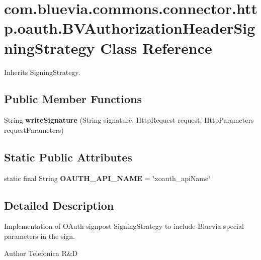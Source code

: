 \hypertarget{classcom_1_1bluevia_1_1commons_1_1connector_1_1http_1_1oauth_1_1BVAuthorizationHeaderSigningStrategy}{
\section{com.bluevia.commons.connector.http.oauth.BVAuthorizationHeaderSigningStrategy Class Reference}
\label{classcom_1_1bluevia_1_1commons_1_1connector_1_1http_1_1oauth_1_1BVAuthorizationHeaderSigningStrategy}
}


Inherits SigningStrategy.

\subsection*{Public Member Functions}
\begin{DoxyCompactItemize}
\item 
\hypertarget{classcom_1_1bluevia_1_1commons_1_1connector_1_1http_1_1oauth_1_1BVAuthorizationHeaderSigningStrategy_a7e0551929dd0b73f3d9de64bfe698c04}{
String {\bfseries writeSignature} (String signature, HttpRequest request, HttpParameters requestParameters)}
\label{classcom_1_1bluevia_1_1commons_1_1connector_1_1http_1_1oauth_1_1BVAuthorizationHeaderSigningStrategy_a7e0551929dd0b73f3d9de64bfe698c04}

\end{DoxyCompactItemize}
\subsection*{Static Public Attributes}
\begin{DoxyCompactItemize}
\item 
\hypertarget{classcom_1_1bluevia_1_1commons_1_1connector_1_1http_1_1oauth_1_1BVAuthorizationHeaderSigningStrategy_a899ed15c21e7ddbf97f4cc680985ea63}{
static final String {\bfseries OAUTH\_\-API\_\-NAME} = \char`\"{}xoauth\_\-apiName\char`\"{}}
\label{classcom_1_1bluevia_1_1commons_1_1connector_1_1http_1_1oauth_1_1BVAuthorizationHeaderSigningStrategy_a899ed15c21e7ddbf97f4cc680985ea63}

\end{DoxyCompactItemize}


\subsection{Detailed Description}
Implementation of OAuth signpost SigningStrategy to include Bluevia special parameters in the sign.

\begin{DoxyAuthor}{Author}
Telefonica R\&D 
\end{DoxyAuthor}
